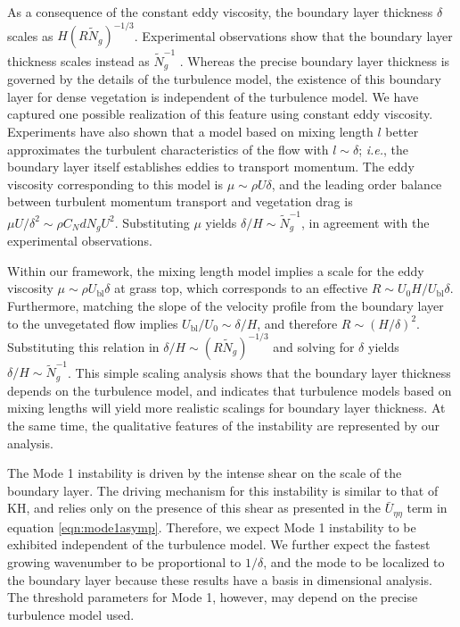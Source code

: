 \documentclass{jfm}
\renewcommand{\Rey}{{R}}
\newcommand{\Ndg}{\tilde{N}_g}
\newcommand{\ubl}{U_\text{bl}}
\newcommand{\ReyNdg}{{\Rey\Ndg}}
\begin{document}
As a consequence of the constant eddy viscosity, the boundary layer thickness $\delta$ scales as $H(\ReyNdg)^{-1/3}$.
Experimental observations show that the boundary layer thickness scales instead as $\Ndg^{-1}$ \citep{Nepf07}.
Whereas the precise boundary layer thickness is governed by the details of the turbulence model, the existence of this boundary layer for dense vegetation is independent of the turbulence model. 
We have captured one possible realization of this feature using constant eddy viscosity.
Experiments have also shown that a model based on mixing length $l$ better approximates the turbulent characteristics of the flow with $l \sim \delta$; \textit{i.e.}, the boundary layer itself establishes eddies to transport momentum. 
The eddy viscosity corresponding to this model is $\mu \sim \rho U \delta$, and the leading order balance between turbulent momentum transport and vegetation drag is $\mu U/\delta^2 \sim \rho C_N d N_g U^2$.
Substituting $\mu$ yields $\delta/H \sim \Ndg^{-1}$, in agreement with the experimental observations.

Within our framework, the mixing length model implies a scale for the eddy viscosity $\mu \sim \rho \ubl \delta$ at grass top, which corresponds to an effective $\Rey \sim U_0H/\ubl \delta$.
Furthermore, matching the slope of the velocity profile from the boundary layer to the unvegetated flow implies $\ubl/U_0 \sim \delta/H$, and therefore $\Rey \sim (H/\delta)^2$.
Substituting this relation in $\delta/H \sim (\Rey \Ndg)^{-1/3}$ and solving for $\delta$ yields $\delta/H \sim \Ndg^{-1}$.
This simple scaling analysis shows that the boundary layer thickness depends on the turbulence model, and indicates that turbulence models based on mixing lengths will yield more realistic scalings for boundary layer thickness.
At the same time, the qualitative features of the instability are represented by our analysis.

The Mode 1 instability is driven by the intense shear on the scale of the boundary layer.
The driving mechanism for this instability is similar to that of KH, and relies only on the presence of this shear as presented in the $\bar{U}_{\eta\eta}$ term in equation \eqref{eqn:mode1asymp}. 
Therefore, we expect Mode 1 instability to be exhibited independent of the turbulence model. 
We further expect the fastest growing wavenumber to be proportional to $1/\delta$, and the mode to be localized to the boundary layer because these results have a basis in dimensional analysis.
The threshold parameters for Mode 1, however, may depend on the precise turbulence model used.
 
\end{document}
